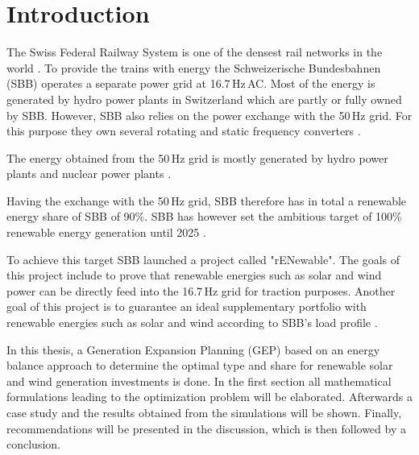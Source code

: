 \chapter{Introduction}
The Swiss Federal Railway System is one of the densest rail networks in the world \cite{uic}. To provide the trains with energy the Schweizerische Bundesbahnen (SBB) operates a separate power grid at 16.7\,Hz\,AC. Most of the energy is generated by hydro power plants in Switzerland which are partly or fully owned by SBB. However, SBB also relies on the power exchange with the 50\,Hz grid. For this purpose they own several rotating and static frequency converters \cite{sbb1}. 

The energy obtained from the 50\,Hz grid is mostly generated by hydro power plants and nuclear power plants \cite{BFS}. 

Having the exchange with the 50\,Hz grid, SBB therefore has in total a renewable energy share of SBB of 90\%. SBB has however set the ambitious target of 100\% renewable energy generation until 2025 \cite{sbb2}. 

To achieve this target SBB launched a project called "rENewable". The goals of this project include to prove that renewable energies such as solar and wind power can be directly feed into the 16.7\,Hz grid for traction purposes. Another goal of this project is to guarantee an ideal supplementary portfolio with renewable energies such as solar and wind according to SBB's load profile \cite{rENewable}. 

In this thesis, a Generation Expansion Planning (GEP) based on an energy balance approach to determine the optimal type and share for renewable solar and wind generation investments is done. In the first section all mathematical formulations leading to the optimization problem will be elaborated. Afterwards a case study and the results obtained from the simulations will be shown. Finally, recommendations will be presented in the discussion, which is then followed by a conclusion. 